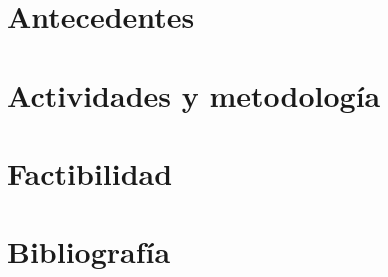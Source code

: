 \documentclass{article}
\begin{document}
\section{Antecedentes}

\section{Actividades y metodolog\'ia}

\section{Factibilidad}

\section{Bibliograf\'ia}




\end{document}

